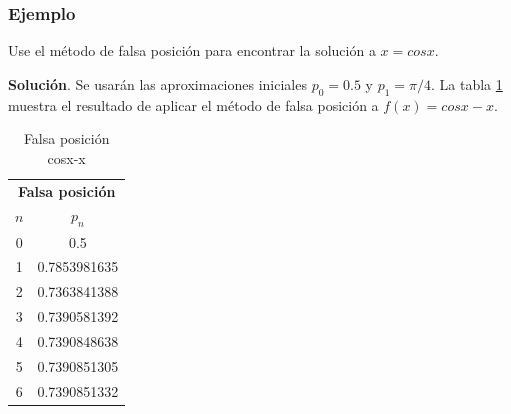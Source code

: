 \subsubsection*{Ejemplo}
Use el método de falsa posición para encontrar la solución a $x=cos x$.

\textbf{Solución}. Se usarán las aproximaciones iniciales $p_0=0.5$ y $p_1=\pi/4$. La tabla \ref{tab:tabla6} muestra el resultado de aplicar el método de falsa posición a $f(x)=cosx-x$.

\begin{table}[h!]
\centering
    \begin{tabular}{||c c||}
    \hline 
    \hline
        \multicolumn{2}{c}{\textbf{Falsa posición}}\tabularnewline
        $n$ & $p_n$      \\
    \hline 
    \hline 
        0 & 0.5 \\
        1 & 0.7853981635 \\
        2 & 0.7363841388 \\
        3 & 0.7390581392 \\
        4 & 0.7390848638 \\
        5 & 0.7390851305 \\
        6 & 0.7390851332 \\
        \hline
        \hline 
    \end{tabular}
\caption{Falsa posición cosx-x}
\label{tab:tabla6} 
\end{table}